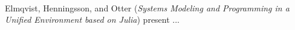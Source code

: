 

\ \hline \ %

Elmqvist, Henningsson, and Otter
\cite{isola-2016-elmqvist}
({\em Systems Modeling and Programming in a
Unified Environment based on Julia})
present ...


